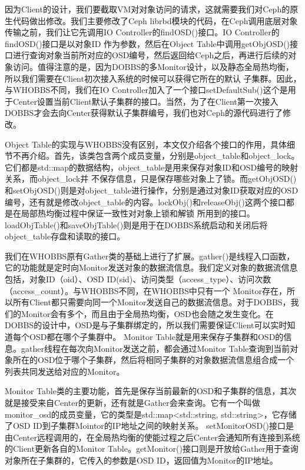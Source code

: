 因为Client的设计，我们要截取VM对对象访问的请求，这就需要我们对Ceph的原生代码做出修改。我们主要修改了Ceph librbd模块的代码，在Ceph调用底层对象传输之前，我们让它先调用IO Controller的findOSD()接口。IO Controller的findOSD()接口是以对象ID
作为参数，然后在Object Table中调用getObjOSD()接口进行查询对象当前所对应的OSD编号，然后返回给Ceph之后，再进行后续的对象访问。值得注意的是，因为DOBBS的多Monitor设计，以及静态全局热均衡，所以我们需要在Client初次接入系统的时候可以获得它所在的默认
子集群。因此，与WHOBBS不同，我们在IO Controller加入了一个接口setDefaultSub()这个是用于Center设置当前Client默认子集群的接口。当然，为了在Client第一次接入DOBBS才会去向Center获得默认子集群编号，我们也对Ceph的源代码进行了修改。

Object Table的实现与WHOBBS没有区别，本文仅介绍各个接口的作用，具体细节不再介绍。首先，该类包含两个成员变量，分别是object\_table和object\_lock。它们都是std::map的数据结构，object\_table是用来保存对象ID和OSD编号的映射关系，而object\_lock并
不保存信息，只是保存哪些对象上了锁。而getObjOSD()和setObjOSD()则是对object\_table进行操作，分别是通过对象ID获取对应的OSD编号，还有就是修改object\_table的内容。lockObj()和releaseObj()这两个接口都是在局部热均衡过程中保证一致性对对象上锁和解锁
所用到的接口。loadObjTable()和saveObjTable()则是用于在DOBBS系统启动和关闭后将object\_table存盘和读取的接口。

我们在WHOBBS原有Gather类的基础上进行了扩展。gather()是线程入口函数，它的功能就是定时向Monitor发送对象的数据流信息。我们定义对象的数据流信息包括，对象ID（oid）、OSD ID(sid)、访问类型（access\_type）、访问次数（access\_count）。与WHOBBS不同，在WHOBBS中只有一个
Monitor存在，所以所有Client都只需要向同一个Monitor发送自己的数据流信息。对于DOBBS，我们的Monitor会有多个，而且由于全局热均衡，OSD也会随之发生变化。在DOBBS的设计中，OSD是与子集群绑定的，所以我们需要保证Client可以实时知道每个OSD都在哪个子集群中。
Monitor Table就是用来保存子集群和OSD的信息。gather线程在每次向Monitor发送之前，都会通过Monitor Table查询到当前对象所在的OSD位于哪个子集群，然后将相同子集群的对象数据流信息组合成一个列表共同发送给对应的Monitor。

Monitor Table类的主要功能，首先是保存当前最新的OSD和子集群的信息，其次就是接受来自Center的更新，还有就是Gather会来查询。它有一个叫做monitor\_osd的成员变量，它的类型是std::map<std::string, std::string>，它存储了OSD ID到子集群Mointor的IP地址之间的映射关系。
setMonitorOSD()接口是由Center远程调用的，在全局热均衡的使能过程之后Center会通知所有连接到系统的Client更新各自的Monitor Table。getMonitor()接口则是开放给Gather用于查询对象所在子集群的，它传入的参数是OSD ID，返回值为Monitor的IP地址。


